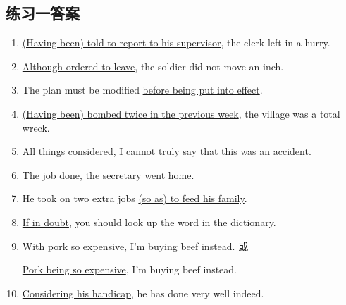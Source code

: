 \subsection{练习一答案}
\begin{enumerate}

\item \ul{(Having been) told to report to his supervisor}, the clerk left in a
  hurry.

\item \ul{Although ordered to leave}, the soldier did not move an inch.

\item The plan must be modified \ul{before being put into effect}.

\item \ul{(Having been) bombed twice in the previous week}, the village was a
  total wreck.

\item \ul{All things considered}, I cannot truly say that this was an accident.
\item \ul{The job done}, the secretary went home.

\item He took on two extra jobs \ul{(so as) to feed his family}.

\item \ul{If in doubt}, you should look up the word in the dictionary.
\item \ul{With pork so expensive}, I'm buying beef instead. 或

  \ul{Pork being so expensive}, I'm buying beef instead.

\item \ul{Considering his handicap}, he has done very well indeed.

\end{enumerate}


